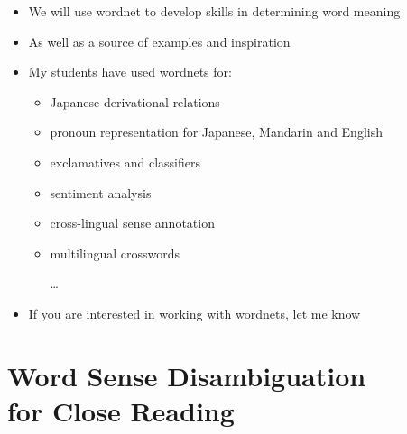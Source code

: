 \documentclass[a4paper,landscape,headrule,footrule,xetex]{foils}
\begin{document}
\begin{itemize}
\item We will use wordnet to develop skills in determining word meaning
\item As well as a source of examples and inspiration
\item   My students have used wordnets for:
  \begin{itemize}
  \item  Japanese derivational
relations \citep{Bond:Wei:2019}
\item  pronoun representation for Japanese, Mandarin and English
  \citep{Seah:Bond:2014}
\item exclamatives and classifiers
\citep{Mok:Gao:Bond:2012,daCosta:Bond:2016}
\item  sentiment analysis
  \citep{Le:Moeljadi:Miura:Ohkuma:2016,Bond:Janz:Piasecki:2019}
\item cross-lingual sense annotation \citep{Bonansinga:Bond:2016}
\item multilingual crosswords \citep{Tan:2012}
\item [\ldots]
\end{itemize}
\item If you are interested in working with wordnets, let me know
\end{itemize}
\section{Word Sense Disambiguation \\ for Close Reading}



\end{document}
